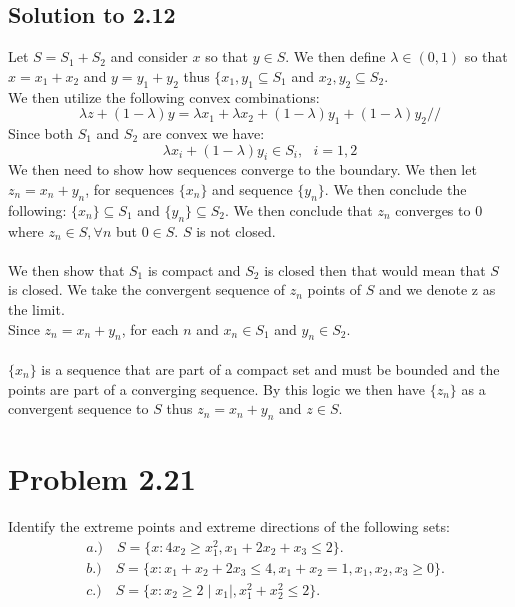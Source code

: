 \documentclass[12pt]{article}
\begin{document}
\subsection{Solution to 2.12}
Let $S = S_1 + S_2$ and consider $x$ so that $y \in S$. We then define $\lambda \in (0,1)$ so that $x = x_1 + x_2$ and $y = y_1 + y_2$ thus $\{ x_1, y_1 \subseteq S_1$ and $x_2 , y_2 \subseteq S_2$.\\
We then utilize the following convex combinations:
    \begin{equation*}
        \lambda z + (1-\lambda)y = \lambda x_1 + \lambda x_2 + (1-\lambda)y_1 + (1-\lambda)y_2//
    \end{equation*}
Since both $S_1$ and $S_2$ are convex we have: 
    \begin{equation*}
        \lambda x_i + (1 - \lambda)y_i \in S_i, \text{ } i=1,2
    \end{equation*}
We then need to show how sequences converge to the boundary. 
We then let $z_n = x_n + y_n$, for sequences $\{x_n\}$ and sequence $\{y_n\}$. We then conclude the following: $\{x_n\} \subseteq S_1$ and $\{y_n\} \subseteq S_2$. We then conclude that $z_n$ converges to 0 where $z_n \in S, \forall n$ but $0 \in S$. $S$ is not closed.\\ \\
We then show that $S_1$ is compact and $S_2$ is closed then that would mean that $S$ is closed. We take the convergent sequence of $z_n$ points of $S$ and we denote z as the limit. \\
Since $z_n = x_n + y_n$, for each $n$ and $x_n \in S_1$ and $y_n \in S_2$.\\ \\ 
$\{x_n\}$ is a sequence that are part of a compact set and must be bounded and the points are part of a converging sequence. By this logic we then have $\{z_n\}$ as a convergent sequence to $S$ thus $z_n = x_n + y_n$ and $z \in S$. 
\section{Problem 2.21}
Identify the extreme points and extreme directions of the following sets:\\
    \begin{align*}
        &a.) \quad S = \{ x: 4x_2 \geq x_1^2, x_1 + 2x_2 + x_3 \leq 2\}.\\
        &b.) \quad S = \{ x: x_1 + x_2 + 2x_3 \leq 4, x_1 + x_2 = 1, x_1, x_2, x_3 \geq 0 \}.\\
        &c.) \quad S = \{ x: x_2 \ge 2\mid x_1 \mid , x_1^2 + x_2^2 \leq 2 \}.\\
    \end{align*} 
\end{document}
